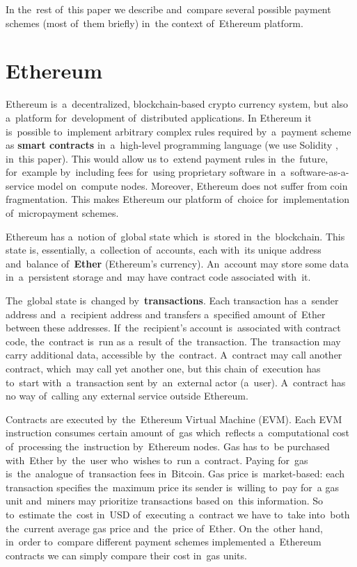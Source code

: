 \documentclass[a4paper]{article}
\begin{document}
    In the~rest of~this paper we describe and~compare several possible payment schemes (most of~them briefly) in~the
    context of~Ethereum platform.

\section{Ethereum}

    Ethereum \cite{ETHEREUM} is~a~decentralized, blockchain-based crypto currency system, but also a~platform
    for~development of~distributed applications. In Ethereum it is~possible to~implement arbitrary complex rules
    required by~a~payment scheme as \textbf{smart contracts} in~a~high-level programming language (we use Solidity
    \cite{SOLIDITY}, in~this paper).
    This would allow us to~extend payment rules in~the~future, for~example by~including fees for~using
    proprietary software in~a~software-as-a-service model on~compute nodes. Moreover, Ethereum does not suffer from
    coin fragmentation. This makes Ethereum our platform of~choice for~implementation of~micropayment schemes.

    Ethereum has a~notion of~global state which~is~stored in~the~blockchain. This state is, essentially, a~collection
    of~accounts, each with~its unique address and~balance of~\textbf{Ether} (Ethereum's currency). An~account may store some
    data in~a~persistent storage and~may have contract code associated with~it.

    The~global state is~changed by~\textbf{transactions}. Each transaction has a~sender address and~a~recipient address and
    transfers a~specified amount of~Ether between these addresses. If~the~recipient's account is~associated with
    contract code, the~contract is~run as a~result of~the~transaction. The~transaction may carry additional data,
    accessible by~the~contract. A~contract may call another contract, which~may call yet another one, but this chain
    of~execution has to~start with~a~transaction sent by~an~external actor (a~user). A~contract has no way of~calling
    any external service outside Ethereum.

    Contracts are executed by~the~Ethereum Virtual Machine (EVM)\cite{ETHERDEV}. Each EVM instruction consumes certain
    amount of~gas which~reflects a~computational cost of~processing the~instruction by~Ethereum nodes. Gas has to~be
    purchased with~Ether by~the~user who~wishes to~run a~contract. Paying for~gas is~the~analogue of~transaction fees
    in~Bitcoin. Gas price is~market-based: each transaction specifies the~maximum price its sender is~willing to~pay
    for~a gas unit and~miners may prioritize transactions based on~this information. So to~estimate the~cost in~USD
    of~executing a~contract we have to~take into~both the~current average gas price and~the~price of~Ether.
    On the~other hand, in~order to~compare different payment schemes implemented a~Ethereum contracts we can simply
    compare their cost in~gas units.
\end{document}
